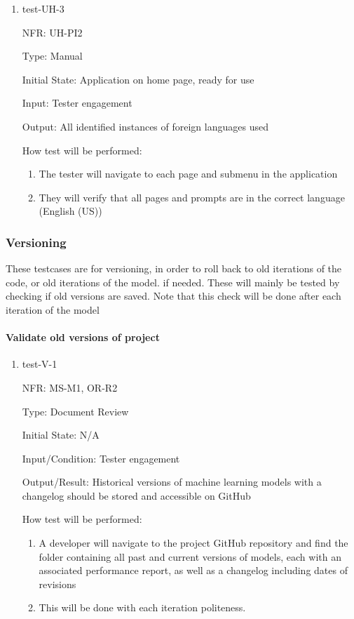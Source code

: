 \documentclass[12pt, titlepage]{article}
\begin{document}
\begin{enumerate}
  \item{test-UH-3}
  
  NFR: UH-PI2

  Type: Manual
            
  Initial State: Application on home page, ready for use
            
  Input: Tester engagement
            
  Output: All identified instances of foreign languages used
            
  How test will be performed: 
  \begin{enumerate}
    \item The tester will navigate to each page and submenu in the application
    \item They will verify that all pages and prompts are in the correct language (English (US))
  \end{enumerate}
  
  \end{enumerate}

\subsubsection{Versioning}
These testcases are for versioning, in order to roll back to old iterations
of the code, or old iterations of the model. if needed. These will mainly be
tested by checking if old versions are saved. Note that this check will be done
after each iteration of the model

\paragraph{Validate old versions of project}
\begin{enumerate}
  \item{test-V-1}

  NFR: MS-M1, OR-R2
  
  Type: Document Review
            
  Initial State: N/A
            
  Input/Condition: Tester engagement
            
  Output/Result: Historical versions of machine learning models with a changelog should be stored and accessible on GitHub
            
  How test will be performed: 
  \begin{enumerate}
    \item A developer will navigate to the project GitHub repository and find the folder containing all past and current versions of models, each with an associated performance report, as well as a changelog including dates of revisions
    \item This will be done with each iteration
    politeness.
  \end{enumerate}
\end{enumerate}
\end{document}

